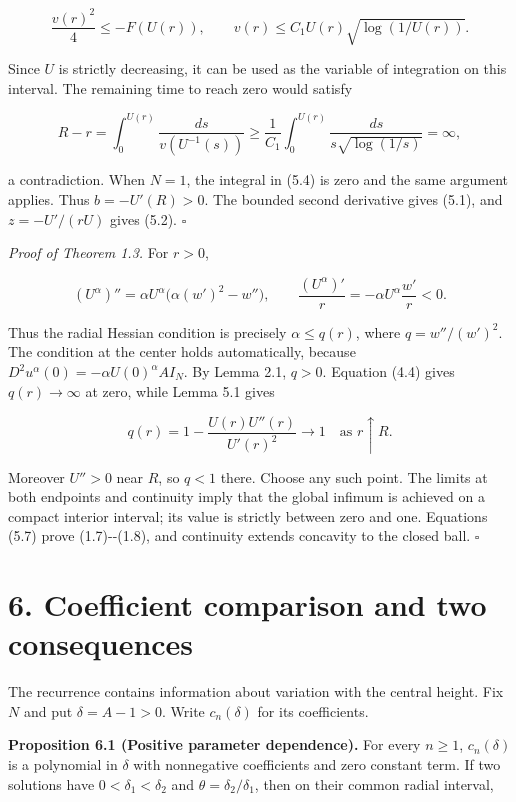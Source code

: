 \documentclass[11pt]{article}
\begin{document}
\[
\frac{v(r)^2}{4}\leq-F(U(r)),\qquad
v(r)\leq C_1U(r)\sqrt{\log(1/U(r))}.
\tag{5.5}
\]

Since \(U\) is strictly decreasing, it can be used as the variable of
integration on this interval. The remaining time to reach zero would
satisfy

\[
R-r=\int_0^{U(r)}\frac{ds}{v(U^{-1}(s))}
\geq\frac1{C_1}\int_0^{U(r)}\frac{ds}{s\sqrt{\log(1/s)}}
=\infty,
\tag{5.6}
\]

a contradiction. When \(N=1\), the integral in (5.4) is zero and the
same argument applies. Thus \(b=-U'(R)>0\). The bounded second
derivative gives (5.1), and \(z=-U'/(rU)\) gives (5.2). \(\square\)

\emph{Proof of Theorem 1.3.} For \(r>0\),

\[
(U^\alpha)''=\alpha U^\alpha\bigl(\alpha(w')^2-w''\bigr),
\qquad
\frac{(U^\alpha)'}r=-\alpha U^\alpha\frac{w'}r<0.
\tag{5.7}
\]

Thus the radial Hessian condition is precisely \(\alpha\leq q(r)\),
where \(q=w''/(w')^2\). The condition at the center holds automatically,
because \(D^2u^\alpha(0)=-\alpha U(0)^\alpha A I_N\). By Lemma 2.1,
\(q>0\). Equation (4.4) gives \(q(r)\to\infty\) at zero, while Lemma 5.1
gives

\[
q(r)=1-\frac{U(r)U''(r)}{U'(r)^2}\longrightarrow1
\quad\text{as }r\uparrow R.
\tag{5.8}
\]

Moreover \(U''>0\) near \(R\), so \(q<1\) there. Choose any such point.
The limits at both endpoints and continuity imply that the global
infimum is achieved on a compact interior interval; its value is
strictly between zero and one. Equations (5.7) prove (1.7)-\/-(1.8), and
continuity extends concavity to the closed ball. \(\square\)

\section{6. Coefficient comparison and two
consequences}\label{coefficient-comparison-and-two-consequences}

The recurrence contains information about variation with the central
height. Fix \(N\) and put \(\delta=A-1>0\). Write \(c_n(\delta)\) for
its coefficients.

\textbf{Proposition 6.1 (Positive parameter dependence).} For every
\(n\geq1\), \(c_n(\delta)\) is a polynomial in \(\delta\) with
nonnegative coefficients and zero constant term. If two solutions have
\(0<\delta_1<\delta_2\) and \(\theta=\delta_2/\delta_1\), then on their
common radial interval,
\end{document}
